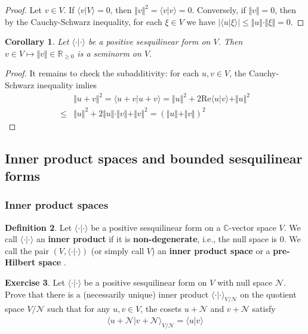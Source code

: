 \documentclass[12pt,b5paper,notitlepage]{article}
\theoremstyle{definition}
\newtheorem{df}{Definition}[subsection]
\newtheorem{exe}[df]{Exercise}
\theoremstyle{plain}
\newtheorem{co}[df]{Corollary}
\newcommand{\bk}[1]{\langle {#1}\rangle}
\newcommand{\scr}{\mathscr}
\newcommand{\Cbb}{\mathbb C}
\newcommand{\Rbb}{\mathbb R}
\newcommand{\Real}{\mathrm{Re}}
\numberwithin{equation}{section}
\begin{document}
\begin{proof}
Let $v\in V$. If $\bk{v|V}=0$, then $\Vert v\Vert^2=\bk{v|v}=0$. Conversely, if $\Vert v\Vert=0$, then by the Cauchy-Schwarz inequality, for each $\xi\in V$ we have $|\bk{u|\xi}|\leq \Vert u\Vert\cdot\Vert\xi\Vert=0$.
\end{proof}





\begin{co}\label{lb115}
Let $\bk{\cdot|\cdot}$ be a positive sesquilinear form on $V$. Then $v\in V\mapsto\Vert v\Vert\in\Rbb_{\geq0}$ is a seminorm on $V$. 
\end{co}

\begin{proof}
It remains to check the subadditivity: for each $u,v\in V$, the Cauchy-Schwarz inequality imlies
\begin{align*}
&\Vert u+v\Vert^2=\bk{u+v|u+v}=\Vert u\Vert^2+2\Real\bk{u|v}+\Vert u\Vert^2\\
\leq& \Vert u\Vert^2+2\Vert u\Vert\cdot\Vert v\Vert+\Vert v\Vert^2=(\Vert u\Vert+\Vert v\Vert)^2
\end{align*}
\end{proof}






\subsection{Inner product spaces and bounded sesquilinear forms}




\subsubsection{Inner product spaces}




\begin{df}
Let $\bk{\cdot|\cdot}$ be a positive sesquilinear form on a $\Cbb$-vector space $V$. We call $\bk{\cdot|\cdot}$ an \textbf{inner product}  if it is  \textbf{non-degenerate}, i.e., the null space is $0$.  We call the pair $(V,\bk{\cdot|\cdot})$ (or simply call $V$) an \textbf{inner product space} or a \textbf{pre-Hilbert space} .
\end{df}



\begin{exe}
Let $\bk{\cdot|\cdot}$ be a positive sesquilinear form on $V$ with null space $\scr N$. Prove that there is a (necessarily unique) inner product $\bk{\cdot|\cdot}_{V/\scr N}$ on the quotient space $V/\scr N$ such that for any $u,v\in V$, the cosets $u+\scr N$ and $v+\scr N$ satisfy
\begin{align*}
\bk{u+\scr N|v+\scr N }_{V/\scr N}=\bk{u|v}
\end{align*}
\end{exe}
\end{document}
